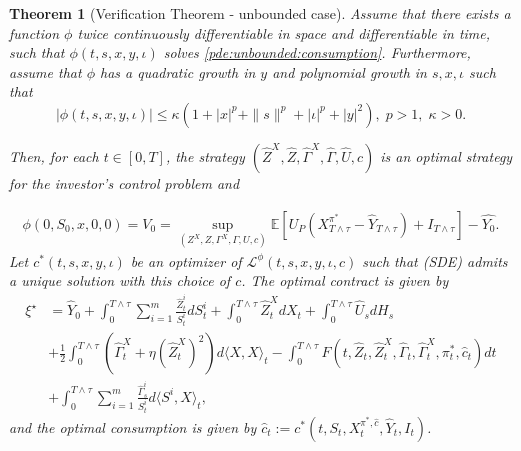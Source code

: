 \documentclass[11pt,a4paper]{article}
\theoremstyle{thmstyleone}%
\newtheorem{theorem}{Theorem}%
\theoremstyle{thmstyletwo}%
\theoremstyle{thmstylethree}%
\newcommand{\T}{T \wedge \tau}
\begin{document}
\begin{itemize}
\begin{theorem}[Verification Theorem - unbounded case]\label{thm:verif:consumption:unbounded}
Assume that there exists a function $\phi$ twice continuously differentiable in space and differentiable in time, such that $\phi(t,s,x,y,\iota)$ solves \eqref{pde:unbounded:consumption}. Furthermore, assume that $\phi$ has a quadratic growth in $y$ and polynomial growth in $s,x,\iota$ such that 
\[|\phi(t,s,x,y,\iota)|\leq \kappa(1+|x|^p+\|s\|^p+|\iota|^p+|y|^2),\; p>1,\; \kappa>0.\]

Then, for each $t \in [0,T]$, the strategy $(\hat{Z}^X, \hat{Z}, \hat{\Gamma}^X, \hat{\Gamma}, \hat{U},\hat c)$ is an optimal strategy for the investor's control problem and

\begin{align*}
    \phi(0,S_0,x,0,0)=V_0 =  \sup_{(Z^X, Z, \Gamma^X, \Gamma, U,c)} \mathbb{E}\left[ U_P(X_{T \wedge \tau}^{\pi^*} - \hat{Y}_{T \wedge \tau})+I_{T\wedge \tau}\right]-\hat{Y_0}.
\end{align*}
Let $c^*(t,s,x,y,\iota)$ be an optimizer of $\mathcal L^\phi(t,s,x,y,\iota,c)$ such that (SDE) admits a unique solution with this choice of $c$. 
The optimal contract is given by 
\begin{align*}
    \xi^\star 
    &= \hat{Y}_0+ \int_{0}^{\T} \sum_{i=1}^m \frac{\hat{Z}^i_t}{S^i_t} dS^i_t + \int_0^{\T} \hat{Z}_t^X dX_t + \int_{0}^{\T} \hat{U}_s dH_s \\
    &+ \frac{1}{2}\int_0^{\T} (\hat{\Gamma}_t^X + \eta (\hat{Z}_t^X)^2 ) d\langle X, X\rangle_t - \int_0^{\T} F(t, \hat{Z}_t, \hat{Z}_t^X, \hat{\Gamma}_t, \hat{\Gamma}_t^X,\pi^*_t,\hat c_t) dt\\
    &+\int_0^{\T} \sum_{i=1}^m \frac{\hat{\Gamma}^i_s}{S^i_t} d\langle S^i, X\rangle_t,
\end{align*}
and the optimal consumption is given by $\hat c_t:=c^*(t,S_t,X^{\pi^*,\hat c}_t,\hat Y_t,I_t)$.
\end{theorem}


\end{itemize}
\end{document}
